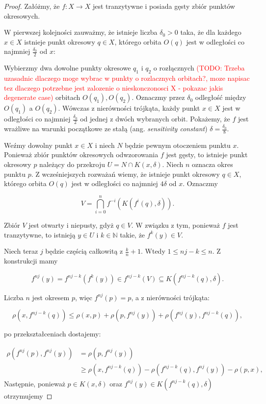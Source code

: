 \documentclass[licencjacka]{pwr_wmat_praca_dyplomowa}
\theoremstyle{plain}
\numberwithin{theorem}{chapter}
\theoremstyle{definition}
\numberwithin{theorem}{chapter}
\begin{document}
\begin{proof}
\cite{onDeveneyDefinitionOfChaos}
Załóżmy, że $f: X \rightarrow X$ jest tranzytywne i posiada gęsty zbiór punktów okresowych.

W pierwszej kolejności zauważmy, że istnieje liczba $\delta_0 > 0$ taka, że dla każdego $x \in X$ istnieje punkt okresowy $q \in X$, którego orbita $O(q)$ jest w odległości co najmniej $\frac{\delta_0}{2}$ od $x$: 

Wybierzmy dwa dowolne punkty okresowe $q_1$ i $q_2$ o rozłącznych \textcolor{red}{(TODO: Trzeba uzasadnic dlaczego moge wybrac w punkty o rozlacznych orbitach?, moze napisac tez dlaczego potrzebne jest zalozenie o nieskonczonosci X - pokazac jakis degenerate case)} orbitach $O(q_1), O(q_2)$. Oznaczmy przez $\delta_0$ odległość między $O(q_1)$ a $O(q_2)$. Wówczas z nierówności trójkąta, każdy punkt $x \in X$ jest w odległości co najmniej $\frac{\delta_0}{2}$ od  jednej z dwóch wybranych orbit.
Pokażemy, że $f$ jest wrażliwe na warunki początkowe ze stałą (ang. \textit{sensitivity constant}) $\delta = \frac{\delta_0}{8}.$

Weźmy dowolny punkt $x \in X$ i niech $N$ będzie pewnym otoczeniem punktu $x$. Ponieważ zbiór punktów okresowych odwzorowania $f$ jest gęsty, to istnieje punkt okresowy $p$ należący do przekroju $U = N \cap K(x, \delta)$. Niech $n$ oznacza okres punktu $p$. Z wcześniejszych rozważań wiemy, że istnieje punkt okresowy $q \in X$, którego orbita $O(q)$ jest w odległości co najmniej $4\delta$ od $x$. Oznaczmy

$$V = \bigcap_{i=0}^n f^{-i}(K(f^i(q), \delta)).$$

Zbiór $V$ jest otwarty i niepusty, gdyż $q \in V.$ W związku z tym, ponieważ $f$ jest tranzytywne, to istnieją $y \in U$ i $k \in \mathbb{N}$ takie, że $f^k(y) \in V$.

Niech teraz $j$ będzie częścią całkowitą z $\frac{k}{n} + 1$. Wtedy $1 \leq nj - k \leq n$. Z konstrukcji mamy

$$f^{nj}(y) = f^{nj-k}(f^k(y)) \in f^{nj-k}(V) \subseteq K(f^{nj-k}(q), \delta).$$

Liczba $n$ jest okresem $p$, więc $f^{nj}(p) = p$, a z nierówności trójkąta:

$$\rho(x, f^{nj-k}(q)) \leq \rho(x, p) + \rho(p, f^{nj}(y)) + \rho(f^{nj}(y), f^{nj-k}(q)),$$

po przekształceniach dostajemy:

\begin{equation}
\begin{aligned}
\rho(f^{nj}(p), f^{nj}(y)) & = \rho(p, f^{nj}(y)) \\
& \geq \rho(x, f^{nj-k}(q)) - \rho(f^{nj-k}(q), f^{nj}(y)) - \rho(p, x),
\end{aligned}
\end{equation}
Następnie, ponieważ $p \in K(x, \delta)$ oraz $f^{nj}(y) \in K(f^{nj-k}(q), \delta)$ otrzymujemy


\end{proof}
\end{document}
